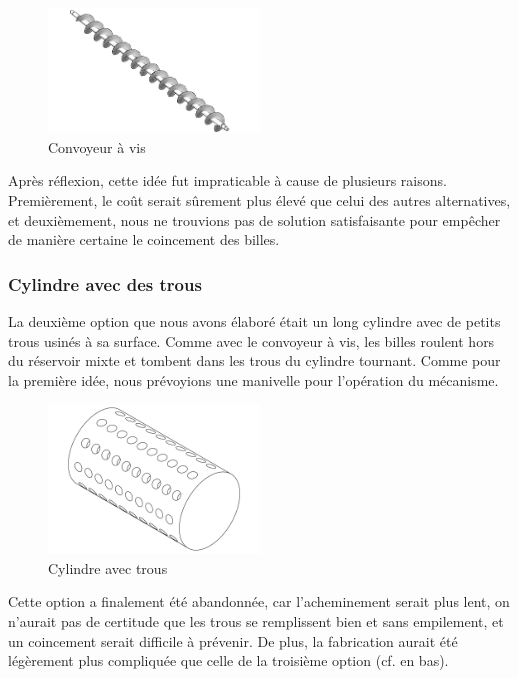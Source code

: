 \begin{figure}
    \centering
    \includegraphics[width=0.5\textwidth]{Graphics/Images_concepts_Leon/795-Screw_conveyor_Kopie.png}
    \caption{Convoyeur à vis}
\end{figure}

Après réflexion, cette idée fut impraticable à cause de plusieurs raisons. Premièrement, le coût serait sûrement plus élevé que celui des autres alternatives, et deuxièmement, nous ne trouvions pas de solution satisfaisante pour empêcher de manière certaine le coincement des billes.

\subsubsection{Cylindre avec des trous}
La deuxième option que nous avons élaboré était un long cylindre avec de petits trous usinés à sa surface. Comme avec le convoyeur à vis, les billes roulent hors du réservoir mixte et tombent dans les trous du cylindre tournant. Comme pour la première idée, nous prévoyions une manivelle pour l'opération du mécanisme.

\begin{figure}[b]
    \centering
    \includegraphics[width=0.5\textwidth]{Graphics/Roue/DRAWING_PROTOTYP_CYLINDRE.pdf}
    \caption{Cylindre avec trous}
\end{figure}

Cette option a finalement été abandonnée, car l'acheminement serait plus lent, on n'aurait pas de certitude que les trous se remplissent bien et sans empilement, et un coincement serait difficile à prévenir. De plus, la fabrication aurait été légèrement plus compliquée que celle de la troisième option (cf. en bas).

